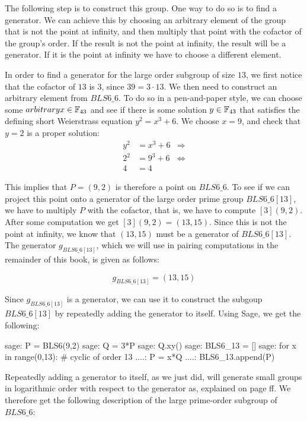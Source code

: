The following step is to construct this group. One way to do so is to find a generator. We can achieve this by choosing an arbitrary element of the group that is not the point at infinity, and then multiply that point with the cofactor of the group's order. If the result is not the point at infinity, the result will be a generator. If it is the point at infinity we have to choose a different element. 

In order to find a generator for the large order subgroup of size $13$, we first notice that the cofactor of $13$ is $3$, since $39=3\cdot 13$. We then need to construct an arbitrary element from $BLS6\_6$. To do so in a pen-and-paper style, we can choose some $arbitrary x\in\mathbb{F}_{43}$ and see if there is some solution $y\in\mathbb{F}_{43}$ that satisfies the defining short Weierstrass equation $y^2 = x^3 + 6$. We choose $x=9$, and check that $y=2$ is a proper solution:
\begin{align*}
y^2 & = x^3 + 6 & \Rightarrow \\
2^2 & = 9^3 + 6 & \Leftrightarrow \\
4 & = 4
\end{align*}   

This implies that $P=(9,2)$ is therefore a point on $BLS6\_6$. To see if we can project this point onto a generator of the large order prime group $BLS6\_6[13]$, we have to multiply $P$ with the cofactor, that is, we have to compute $[3](9,2)$. After some computation  we get $[3](9,2) = (13,15)$. Since this is not the point at infinity, we know that $(13,15)$ must be a generator of $BLS6\_6[13]$. The generator $g_{BLS6\_6[13]}$, which we will use in pairing computations in the remainder of this book, is given as follows:

\begin{equation}\label{gBLS6-6-13}
g_{BLS6\_6[13]} = (13,15)
\end{equation}

Since $g_{BLS6\_6[13]}$ is a generator, we can use it to construct the subgoup $BLS6\_6[13]$ by repeatedly adding the generator to itself. Using Sage, we get the following:
\begin{sagecommandline}
sage: P = BLS6(9,2)
sage: Q = 3*P
sage: Q.xy()
sage: BLS6_13 = []
sage: for x in range(0,13): # cyclic of order 13
....:     P = x*Q
....:     BLS6_13.append(P)
\end{sagecommandline}
Repeatedly adding a generator to itself, as we just did, will generate small groups in logarithmic order with respect to the generator as, explained on page \pageref{generators} ff. We therefore get the following description of the large prime-order subgroup of $BLS6\_6$:


